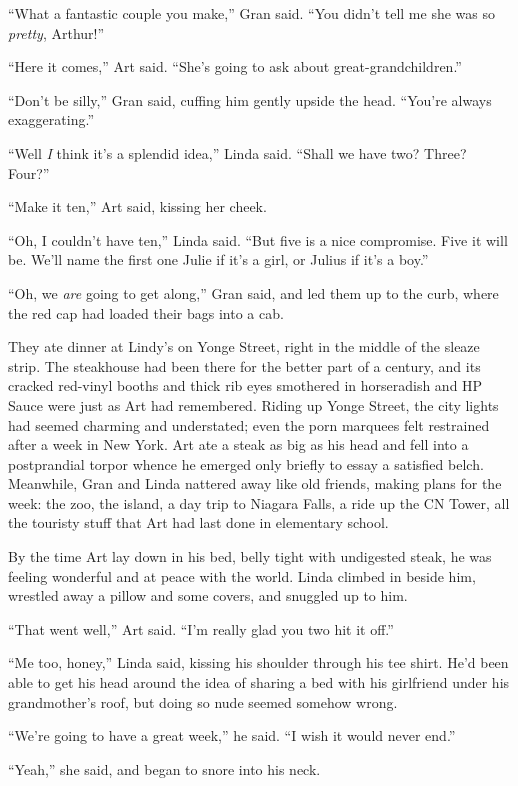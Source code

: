 “What a fantastic couple you make,” Gran said. “You didn’t tell me
she was so \emph{pretty}, Arthur!”

“Here it comes,” Art said. “She’s going to ask about
great-grandchildren.”

“Don’t be silly,” Gran said, cuffing him gently upside the head.
“You’re always exaggerating.”

“Well \emph{I} think it’s a splendid idea,” Linda said. “Shall we
have two? Three? Four?”

“Make it ten,” Art said, kissing her cheek.

“Oh, I couldn’t have ten,” Linda said. “But five is a nice
compromise. Five it will be. We’ll name the first one Julie if it’s
a girl, or Julius if it’s a boy.”

“Oh, we \emph{are} going to get along,” Gran said, and led them up
to the curb, where the red cap had loaded their bags into a cab.

They ate dinner at Lindy’s on Yonge Street, right in the middle of
the sleaze strip. The steakhouse had been there for the better part
of a century, and its cracked red-vinyl booths and thick rib eyes
smothered in horseradish and HP Sauce were just as Art had
remembered. Riding up Yonge Street, the city lights had seemed
charming and understated; even the porn marquees felt restrained
after a week in New York. Art ate a steak as big as his head and
fell into a postprandial torpor whence he emerged only briefly to
essay a satisfied belch. Meanwhile, Gran and Linda nattered away
like old friends, making plans for the week: the zoo, the island, a
day trip to Niagara Falls, a ride up the CN Tower, all the touristy
stuff that Art had last done in elementary school.

By the time Art lay down in his bed, belly tight with undigested
steak, he was feeling wonderful and at peace with the world. Linda
climbed in beside him, wrestled away a pillow and some covers, and
snuggled up to him.

“That went well,” Art said. “I’m really glad you two hit it off.”

“Me too, honey,” Linda said, kissing his shoulder through his tee
shirt. He’d been able to get his head around the idea of sharing a
bed with his girlfriend under his grandmother’s roof, but doing so
nude seemed somehow wrong.

“We’re going to have a great week,” he said. “I wish it would never
end.”

“Yeah,” she said, and began to snore into his neck.

